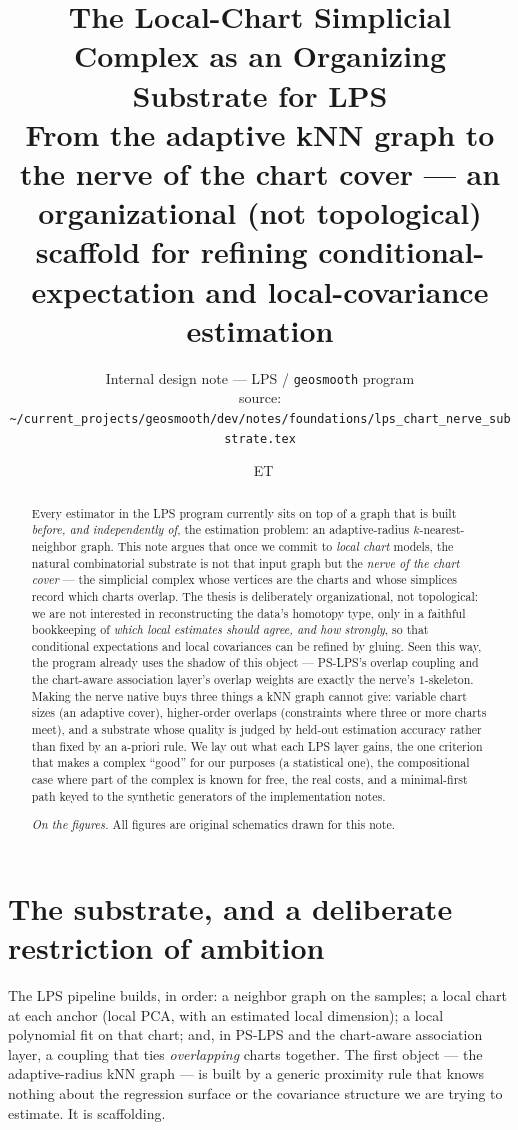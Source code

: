 \documentclass[11pt]{article}
\title{\textbf{The Local-Chart Simplicial Complex as an Organizing Substrate
for LPS}\\[4pt]
\large From the adaptive kNN graph to the nerve of the chart cover --- an
organizational (not topological) scaffold for refining conditional-expectation
and local-covariance estimation}
\author{\small Internal design note --- LPS / \texttt{geosmooth} program\\[2pt]
\footnotesize source: \nolinkurl{~/current_projects/geosmooth/dev/notes/foundations/lps_chart_nerve_substrate.tex}}
\date{\DTMnow\ \textnormal{\footnotesize ET}}
\theoremstyle{definition}
\begin{document}
\maketitle

\begin{abstract}\noindent
Every estimator in the LPS program currently sits on top of a graph that is built
\emph{before, and independently of}, the estimation problem: an adaptive-radius
$k$-nearest-neighbor graph. This note argues that once we commit to \emph{local
chart} models, the natural combinatorial substrate is not that input graph but the
\emph{nerve of the chart cover} --- the simplicial complex whose vertices are the
charts and whose simplices record which charts overlap. The thesis is
deliberately organizational, not topological: we are not interested in
reconstructing the data's homotopy type, only in a faithful bookkeeping of
\emph{which local estimates should agree, and how strongly}, so that conditional
expectations and local covariances can be refined by gluing. Seen this way, the
program already uses the shadow of this object --- PS-LPS's overlap coupling and
the chart-aware association layer's overlap weights are exactly the nerve's
$1$-skeleton. Making the nerve native buys three things a kNN graph cannot give:
variable chart sizes (an adaptive cover), higher-order overlaps (constraints where
three or more charts meet), and a substrate whose quality is judged by held-out
estimation accuracy rather than fixed by an a-priori rule. We lay out what each
LPS layer gains, the one criterion that makes a complex ``good'' for our purposes
(a statistical one), the compositional case where part of the complex is known for
free, the real costs, and a minimal-first path keyed to the synthetic generators
of the implementation notes.
\par\medskip\noindent\footnotesize\textit{On the figures.} All figures are
original schematics drawn for this note.
\end{abstract}

{\small\tableofcontents}

\section{The substrate, and a deliberate restriction of ambition}\label{sec:thesis}

The LPS pipeline builds, in order: a neighbor graph on the samples; a local chart
at each anchor (local PCA, with an estimated local dimension); a local polynomial
fit on that chart; and, in PS-LPS and the chart-aware association layer, a
coupling that ties \emph{overlapping} charts together. The first object --- the
adaptive-radius kNN graph --- is built by a generic proximity rule that knows
nothing about the regression surface or the covariance structure we are trying to
estimate. It is scaffolding.
\end{document}
